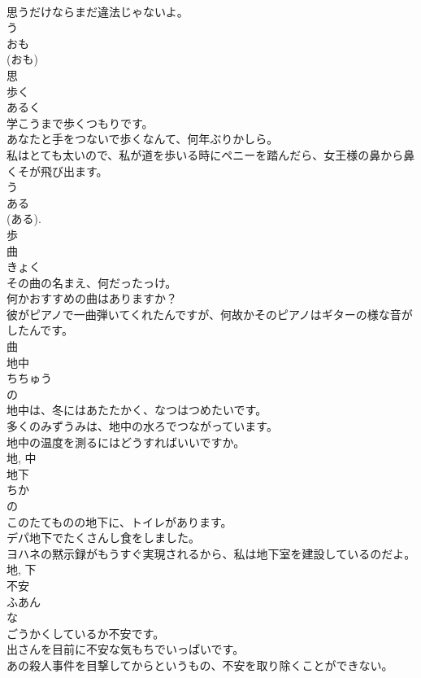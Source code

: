 \documentclass[8pt]{extreport}
\begin{document}
\begin{CJK}{UTF8}{min}
\\	思うだけならまだ違法じゃないよ。	
\\	う 
\\	おも 
\\	(おも) 
\\	思	
\\	歩く	
\\	あるく	
\\	学こうまで歩くつもりです。	
\\	あなたと手をつないで歩くなんて、何年ぶりかしら。	
\\	私はとても太いので、私が道を歩いる時にペニーを踏んだら、女王様の鼻から鼻くそが飛び出ます。	
\\	う 
\\	ある 
\\	(ある). 
\\	歩	
\\	曲	
\\	きょく	
\\	その曲の名まえ、何だったっけ。	
\\	何かおすすめの曲はありますか？	
\\	彼がピアノで一曲弾いてくれたんですが、何故かそのピアノはギターの様な音がしたんです。	
\\	曲	
\\	地中	
\\	ちちゅう	
\\	の 
\\	地中は、冬にはあたたかく、なつはつめたいです。	
\\	多くのみずうみは、地中の水ろでつながっています。	
\\	地中の温度を測るにはどうすればいいですか。	
\\	地, 中	
\\	地下	
\\	ちか	
\\	の 
\\	このたてものの地下に、トイレがあります。	
\\	デパ地下でたくさんし食をしました。	
\\	ヨハネの黙示録がもうすぐ実現されるから、私は地下室を建設しているのだよ。	
\\	地, 下	
\\	不安	
\\	ふあん	
\\	な 
\\	ごうかくしているか不安です。	
\\	出さんを目前に不安な気もちでいっぱいです。	
\\	あの殺人事件を目撃してからというもの、不安を取り除くことができない。	

\end{CJK}
\end{document}
